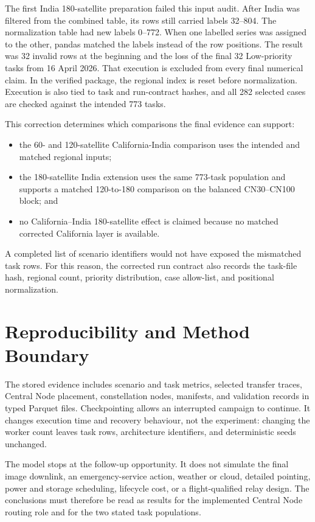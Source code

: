 The first India 180-satellite preparation failed this input audit. After India was filtered from the combined table, its rows still carried labels 32--804. The normalization table had new labels 0--772. When one labelled series was assigned to the other, pandas matched the labels instead of the row positions. The result was 32 invalid rows at the beginning and the loss of the final 32 Low-priority tasks from 16 April 2026. That execution is excluded from every final numerical claim. In the verified package, the regional index is reset before normalization. Execution is also tied to task and run-contract hashes, and all 282 selected cases are checked against the intended 773 tasks.

This correction determines which comparisons the final evidence can support:

\begin{itemize}
\item the 60- and 120-satellite California-India comparison uses the intended and matched regional inputs;
\item the 180-satellite India extension uses the same 773-task population and supports a matched 120-to-180 comparison on the balanced CN30--CN100 block; and
\item no California--India 180-satellite effect is claimed because no matched corrected California layer is available.
\end{itemize}
A completed list of scenario identifiers would not have exposed the mismatched task rows. For this reason, the corrected run contract also records the task-file hash, regional count, priority distribution, case allow-list, and positional normalization.

\section{Reproducibility and Method Boundary}
The stored evidence includes scenario and task metrics, selected transfer traces, Central Node placement, constellation nodes, manifests, and validation records in typed Parquet files. Checkpointing allows an interrupted campaign to continue. It changes execution time and recovery behaviour, not the experiment: changing the worker count leaves task rows, architecture identifiers, and deterministic seeds unchanged.

The model stops at the follow-up opportunity. It does not simulate the final image downlink, an emergency-service action, weather or cloud, detailed pointing, power and storage scheduling, lifecycle cost, or a flight-qualified relay design. The conclusions must therefore be read as results for the implemented Central Node routing role and for the two stated task populations.

